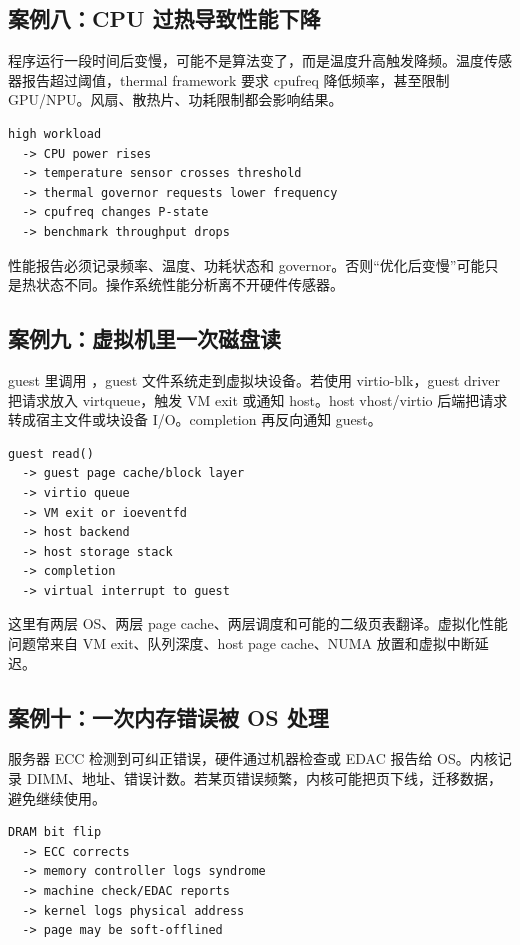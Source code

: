 \subsection{案例八：CPU 过热导致性能下降}

程序运行一段时间后变慢，可能不是算法变了，而是温度升高触发降频。温度传感器报告超过阈值，thermal framework 要求 cpufreq 降低频率，甚至限制 GPU/NPU。风扇、散热片、功耗限制都会影响结果。

\begin{lstlisting}
high workload
  -> CPU power rises
  -> temperature sensor crosses threshold
  -> thermal governor requests lower frequency
  -> cpufreq changes P-state
  -> benchmark throughput drops
\end{lstlisting}

性能报告必须记录频率、温度、功耗状态和 governor。否则“优化后变慢”可能只是热状态不同。操作系统性能分析离不开硬件传感器。

\subsection{案例九：虚拟机里一次磁盘读}

guest 里调用 ，guest 文件系统走到虚拟块设备。若使用 virtio-blk，guest driver 把请求放入 virtqueue，触发 VM exit 或通知 host。host vhost/virtio 后端把请求转成宿主文件或块设备 I/O。completion 再反向通知 guest。

\begin{lstlisting}
guest read()
  -> guest page cache/block layer
  -> virtio queue
  -> VM exit or ioeventfd
  -> host backend
  -> host storage stack
  -> completion
  -> virtual interrupt to guest
\end{lstlisting}

这里有两层 OS、两层 page cache、两层调度和可能的二级页表翻译。虚拟化性能问题常来自 VM exit、队列深度、host page cache、NUMA 放置和虚拟中断延迟。

\subsection{案例十：一次内存错误被 OS 处理}

服务器 ECC 检测到可纠正错误，硬件通过机器检查或 EDAC 报告给 OS。内核记录 DIMM、地址、错误计数。若某页错误频繁，内核可能把页下线，迁移数据，避免继续使用。

\begin{lstlisting}
DRAM bit flip
  -> ECC corrects
  -> memory controller logs syndrome
  -> machine check/EDAC reports
  -> kernel logs physical address
  -> page may be soft-offlined
\end{lstlisting}

